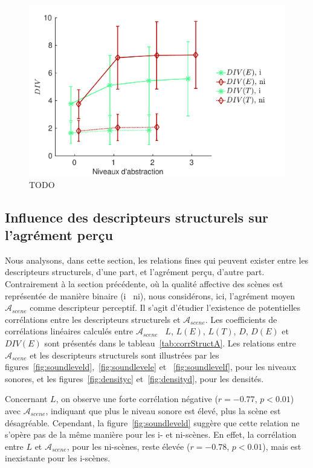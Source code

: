 \begin{figure}[t]
        \myfloatalign
        \includegraphics[width=.8\linewidth]{gfx/ch_5/xp1_div_1}
       \caption[TODO]{TODO}\label{fig:diversity}
\end{figure}

\subsection{Influence des descripteurs structurels sur l'agrément perçu}
\label{sec:ch5_corrDesStruct}

Nous analysons, dans cette section, les relations fines qui peuvent exister entre les descripteurs structurels, d'une part, et l'agrément perçu, d'autre part. Contrairement à la section précédente, où la qualité affective des scènes est représentée de manière binaire (i \vs~ni), nous considérons, ici, l'agrément moyen $\mathcal{A}_{scene}$ comme descripteur perceptif. Il s'agit d'étudier l'existence de potentielles corrélations entre les descripteurs structurels et $\mathcal{A}_{scene}$. Les coefficients de corrélations linéaires calculés entre $\mathcal{A}_{scene}$ \vs~$L$, $L(E)$, $L(T)$, $D$, $D(E)$ et $DIV(E)$ sont présentés dans le tableau~\ref{tab:corrStructA}. Les relations entre $\mathcal{A}_{scene}$ et les descripteurs structurels sont illustrées par les figures~\ref{fig:soundleveld},~\ref{fig:soundlevele} et ~\ref{fig:soundlevelf}, pour les niveaux sonores, et les figures~\ref{fig:densityc} et~\ref{fig:densityd}, pour les densités. 

Concernant $L$, on observe une forte corrélation négative ($r=-0.77$, $p<0.01$) avec $\mathcal{A}_{scene}$, indiquant que plus le niveau sonore est élevé, plus la scène est désagréable. Cependant, la figure~\ref{fig:soundleveld} suggère que cette relation ne s'opère pas de la même manière pour les i- et ni-scènes. En effet, la corrélation entre $L$ et $\mathcal{A}_{scene}$, pour les ni-scènes, reste élevée ($r=-0.78$, $p<0.01$), mais est inexistante pour les i-scènes. 

